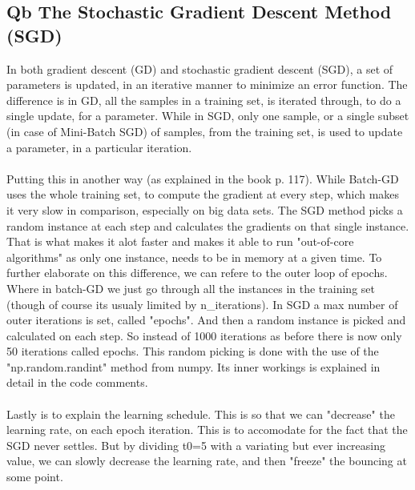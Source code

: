 \documentclass{article}
\begin{document}
\subsection{Qb The Stochastic Gradient Descent Method (SGD)}

In both gradient descent (GD) and stochastic gradient descent (SGD), 
a set of parameters is updated, in an iterative manner to minimize an error function.
The difference is in GD, all the samples in a training set, is iterated through, to do a single update,
for a parameter. While in SGD, only one sample, or a single subset (in case of Mini-Batch SGD) of samples, 
from the training set, is used to update a parameter, in a particular iteration.
\\ \\
Putting this in another way (as explained in the book p. 117). While Batch-GD uses the whole training set,
to compute the gradient at every step, which makes it very slow in comparison, especially on big data sets.
The SGD method picks a random instance at each step and calculates the gradients on that single instance.
That is what makes it alot faster and makes it able to run "out-of-core algorithms" as only one instance,
needs to be in memory at a given time. To further elaborate on this difference, we can refere to the outer loop of epochs.
Where in batch-GD we just go through all the instances in the training set 
(though of course its usualy limited by n\_iterations). In SGD a max number of outer iterations is set,
called "epochs". And then a random instance is picked and calculated on each step.
So instead of 1000 iterations as before there is now only 50 iterations called epochs.
This random picking is done with the use of the "np.random.randint" method from numpy.
Its inner workings is explained in detail in the code comments.
\\ \\
Lastly is to explain the learning schedule. This is so that we can "decrease" the learning rate,
on each epoch iteration. This is to accomodate for the fact that the SGD never settles.
But by dividing t0=5 with a variating but ever increasing value, we can slowly decrease the learning rate,
and then "freeze" the bouncing at some point.
\end{document}
